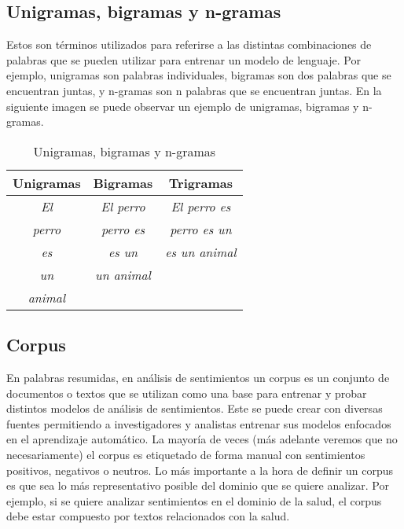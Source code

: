 \documentclass[12pt, conference]{IEEEtran}
\begin{document}
\subsection{Unigramas, bigramas y n-gramas}

Estos son términos utilizados para referirse a las distintas combinaciones de palabras que se pueden utilizar para entrenar un modelo de lenguaje. Por ejemplo, unigramas son palabras individuales, bigramas son dos palabras que se encuentran juntas, y n-gramas son n palabras que se encuentran juntas. En la siguiente imagen se puede observar un ejemplo de unigramas, bigramas y n-gramas.

\begin{table}[h]
\centering
\begin{tabular}{|c|c|c|}
\hline
\textbf{Unigramas} & \textbf{Bigramas} & \textbf{Trigramas} \\ \hline
\textit{El} & \textit{El perro} & \textit{El perro es} \\ \hline
\textit{perro} & \textit{perro es} & \textit{perro es un} \\ \hline
\textit{es} & \textit{es un} & \textit{es un animal} \\ \hline
\textit{un} & \textit{un animal} & \textit{} \\ \hline
\textit{animal} & \textit{} & \textit{} \\ \hline
\end{tabular}
\caption{Unigramas, bigramas y n-gramas}
\label{tab:my_label}
\end{table}

\subsection{Corpus}

En palabras resumidas, en análisis de sentimientos un corpus es un conjunto de documentos o textos que se utilizan como una base para entrenar y probar distintos modelos de análisis de sentimientos. Este se puede crear con diversas fuentes permitiendo a investigadores y analistas entrenar sus modelos enfocados en el aprendizaje automático. La mayoría de veces (más adelante veremos que no necesariamente) el corpus es etiquetado de forma manual con sentimientos positivos, negativos o neutros. Lo más importante a la hora de definir un corpus es que sea lo más representativo posible del dominio que se quiere analizar. Por ejemplo, si se quiere analizar sentimientos en el dominio de la salud, el corpus debe estar compuesto por textos relacionados con la salud.
\end{document}
